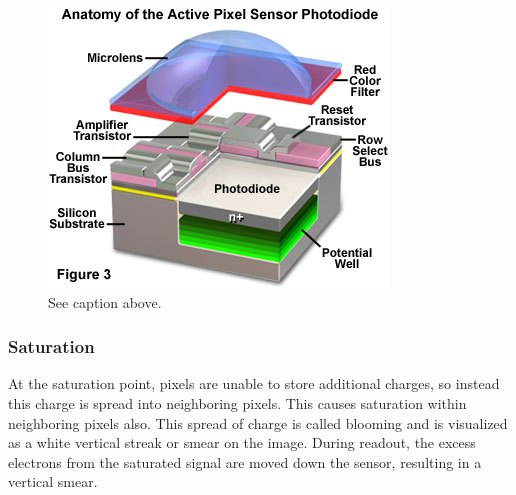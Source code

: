 \documentclass[10pt]{article}
\begin{document}
\begin{multicols}{2}
\begin{figure}[H]
    \includegraphics[width=1\linewidth]{Images/Week 2/pixel-diagram.png}
    \caption{See caption above.}
\end{figure}

\subsubsection{Saturation}
At the saturation point, pixels are unable to store additional charges, so instead this charge is spread into neighboring pixels. This causes saturation within neighboring pixels also. This spread of charge is called blooming and is visualized as a white vertical streak or smear on the image. During readout, the excess electrons from the saturated signal are moved down the sensor, resulting in a vertical smear.


\end{multicols}
\end{document}

